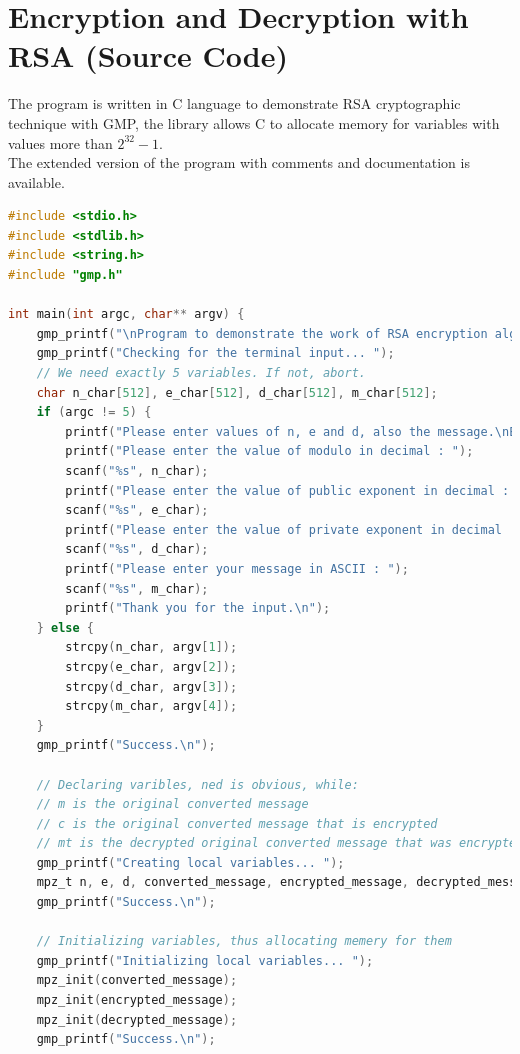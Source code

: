 \documentclass[a4paper, 12pt]{article}
\begin{document}
\newpage 

\section{Encryption and Decryption with RSA (Source Code)}
\label{big}
The program is written in C\cite{Clang} language to demonstrate RSA cryptographic technique
with GMP\cite{gmp}, the library allows C to allocate memory for variables with values more than $2 ^{32} - 1$. \cite{limit}\\

The extended version of the program with comments and documentation is available\cite{github}.

\begin{lstlisting}[language=C, caption=Source Code of rsa.c]
#include <stdio.h> 
#include <stdlib.h>
#include <string.h>
#include "gmp.h"

int main(int argc, char** argv) {
    gmp_printf("\nProgram to demonstrate the work of RSA encryption algorithm.\n\n");
    gmp_printf("Checking for the terminal input... ");
    // We need exactly 5 variables. If not, abort.
    char n_char[512], e_char[512], d_char[512], m_char[512];
    if (argc != 5) {
        printf("Please enter values of n, e and d, also the message.\nExiting...\n");
        printf("Please enter the value of modulo in decimal : ");
        scanf("%s", n_char);
        printf("Please enter the value of public exponent in decimal : ");
        scanf("%s", e_char);
        printf("Please enter the value of private exponent in decimal : ");
        scanf("%s", d_char);
        printf("Please enter your message in ASCII : ");
        scanf("%s", m_char);
        printf("Thank you for the input.\n");
    } else {
        strcpy(n_char, argv[1]);
        strcpy(e_char, argv[2]);
        strcpy(d_char, argv[3]);
        strcpy(m_char, argv[4]);
    }
    gmp_printf("Success.\n");
    
    // Declaring varibles, ned is obvious, while:
    // m is the original converted message
    // c is the original converted message that is encrypted
    // mt is the decrypted original converted message that was encrypted 
    gmp_printf("Creating local variables... ");
    mpz_t n, e, d, converted_message, encrypted_message, decrypted_message;
    gmp_printf("Success.\n");
    
    // Initializing variables, thus allocating memery for them
    gmp_printf("Initializing local variables... ");
    mpz_init(converted_message);
    mpz_init(encrypted_message);
    mpz_init(decrypted_message);
    gmp_printf("Success.\n");
    

\end{lstlisting}
\end{document}
